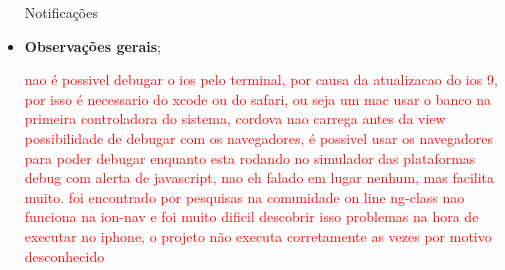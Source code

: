 \begin{itemize}
 	Notificações
 	
 	
 	\item \textbf{Observações gerais}; 	
 	
 	\textcolor{red}{nao é possivel debugar o ios pelo terminal, por causa da atualizacao do ios 9, por isso é necessario do xcode ou do safari, ou seja um mac}
 	\textcolor{red}{usar o banco na primeira controladora do sistema, cordova nao carrega antes da view}
 	\textcolor{red}{possibilidade de debugar com os navegadores, é possivel usar os navegadores para poder debugar enquanto esta rodando no simulador das plataformas}
 	\textcolor{red}{debug com alerta de javascript, nao eh falado em lugar nenhum, mas facilita muito. foi encontrado por pesquisas na comunidade on line}
 	\textcolor{red}{ng-class nao funciona na ion-nav e foi muito dificil descobrir isso}
 	\textcolor{red}{problemas na hora de executar no iphone, o projeto não executa corretamente as vezes por motivo desconhecido}
 	
 \end{itemize}



